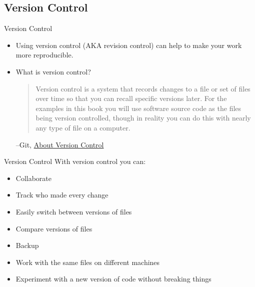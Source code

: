 \documentclass{beamer}
\begin{document}
\subsection{Version Control}
\begin{frame}{Version Control}
\begin{itemize}[<+->]
\item
Using version control (AKA revision control) can help to make your work more reproducible.

\item
What is version control?

\begin{quote}
Version control is a system that records changes to a file or set of files over time so that you can recall specific versions later. For the examples in this book you will use software source code as the files being version controlled, though in reality you can do this with nearly any type of file on a computer.
\end{quote}
--Git, \href{https://git-scm.com/book/en/v2/Getting-Started-About-Version-Control}{About Version Control}

\end{itemize}
\end{frame}
\begin{frame}{Version Control}
With version control you can:
\begin{itemize}
\item Collaborate 
\item Track who made every change
\item Easily switch between versions of files
\item Compare versions of files
\item Backup
\item Work with the same files on different machines
\item Experiment with a new version of code without breaking things
\end{itemize}
\href{http://stackoverflow.com/questions/1408450/why-should-i-use-version-control}{}
\href{http://tex.stackexchange.com/questions/1118/what-are-the-advantages-of-using-version-control-git-cvs-etc-in-latex-documen}{}
\href{http://stackoverflow.com/questions/1408450/why-should-i-use-version-control}{}
\end{frame}
\end{document}
